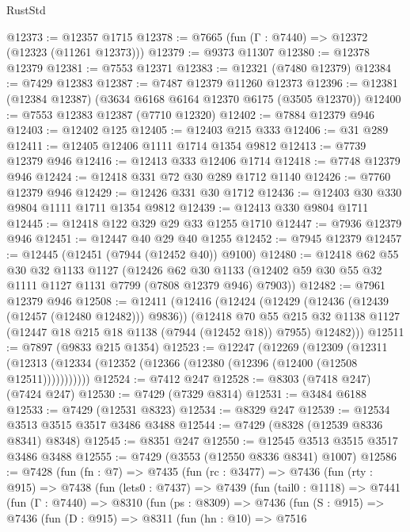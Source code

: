 \begin{lexlean}{RustStd}
\begin{coremodule}
@12373 := @12357 @1715
@12378 := @7665 (fun (Γ : @7440) => @12372 (@12323 (@11261 @12373)))
@12379 := @9373 @11307
@12380 := @12378 @12379
@12381 := @7553 @12371
@12383 := @12321 (@7480 @12379)
@12384 := @7429 @12383
@12387 := @7487 @12379 @11260 @12373
@12396 := @12381 (@12384 @12387) (@3634 @6168 @6164 @12370 @6175 (@3505 @12370))
@12400 := @7553 @12383 @12387 (@7710 @12320)
@12402 := @7884 @12379 @946
@12403 := @12402 @125
@12405 := @12403 @215 @333
@12406 := @31 @289
@12411 := @12405 @12406 @1111 @1714 @1354 @9812
@12413 := @7739 @12379 @946
@12416 := @12413 @333 @12406 @1714
@12418 := @7748 @12379 @946
@12424 := @12418 @331 @72 @30 @289 @1712 @1140
@12426 := @7760 @12379 @946
@12429 := @12426 @331 @30 @1712
@12436 := @12403 @30 @330 @9804 @1111 @1711 @1354 @9812
@12439 := @12413 @330 @9804 @1711
@12445 := @12418 @122 @329 @29 @33 @1255 @1710
@12447 := @7936 @12379 @946
@12451 := @12447 @40 @29 @40 @1255
@12452 := @7945 @12379
@12457 := @12445 (@12451 (@7944 (@12452 @40)) @9100)
@12480 := @12418
    @62
    @55
    @30
    @32
    @1133
    @1127
    (@12426
      @62
      @30
      @1133
      (@12402 @59 @30 @55 @32 @1111 @1127 @1131 @7799 (@7808 @12379 @946) @7903))
@12482 := @7961 @12379 @946
@12508 := @12411
    (@12416
      (@12424
        (@12429 (@12436 (@12439 (@12457 (@12480 @12482))) @9836))
        (@12418
          @70
          @55
          @215
          @32
          @1138
          @1127
          (@12447 @18 @215 @18 @1138 (@7944 (@12452 @18)) @7955)
          @12482)))
@12511 := @7897 (@9833 @215 @1354)
@12523 := @12247
    (@12269
      (@12309
        (@12311 (@12313 (@12334 (@12352 (@12366 (@12380 (@12396 (@12400 (@12508 @12511)))))))))))
@12524 := @7412 @247
@12528 := @8303 (@7418 @247) (@7424 @247)
@12530 := @7429 (@7329 @8314)
@12531 := @3484 @6188
@12533 := @7429 (@12531 @8323)
@12534 := @8329 @247
@12539 := @12534 @3513 @3515 @3517 @3486 @3488
@12544 := @7429 (@8328 (@12539 @8336 @8341) @8348)
@12545 := @8351 @247
@12550 := @12545 @3513 @3515 @3517 @3486 @3488
@12555 := @7429 (@3553 (@12550 @8336 @8341) @1007)
@12586 := @7428
    (fun (fn : @7) =>
    @7435
      (fun (rc : @3477) =>
      @7436
        (fun (rty : @915) =>
        @7438
          (fun (lets0 : @7437) =>
          @7439
            (fun (tail0 : @1118) =>
            @7441
              (fun (Γ : @7440) =>
              @8310
                (fun (ps : @8309) =>
                @7436
                  (fun (S : @915) =>
                  @7436
                    (fun (D : @915) =>
                    @8311
                      (fun (hn : @10) =>
                      @7516

\end{coremodule}
\end{lexlean}
